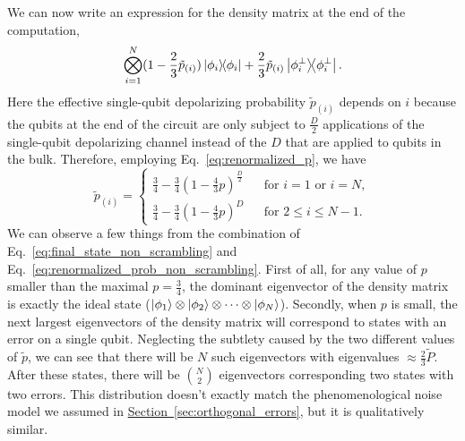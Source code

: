 \documentclass[
amsmath,
amssymb,
aps,
pra,
reprint,
twocolumn,
superscriptaddress,
longbibliography,
showkeys,
floatfix
]{revtex4-1}
\def\ket#1{\ensuremath{\mathinner{|{#1}\rangle}}}
\newcommand{\eq}[1]{Eq.~\hyperref[eq:#1]{\ref*{eq:#1}}}
\renewcommand{\sec}[1]{\hyperref[sec:#1]{Section~\ref*{sec:#1}}}
\begin{document}
We can now write an expression for the density matrix at the end of the
computation,
\begin{equation}
  \bigotimes_{i=1}^{N} (1 - \frac{2}{3}\tilde{p}_{(i)}) \ketbra{\phi_i} + \frac{2}{3}\tilde{p}_{(i)} \ketbra{\phi_i^\perp}.
  \label{eq:final_state_non_scrambling}
\end{equation}
Here the effective single-qubit depolarizing probability \(\tilde{p}_{(i)}\)
depends on \(i\) because the qubits at the end of the circuit are only subject
to \(\frac{D}{2}\) applications of the single-qubit depolarizing channel instead
of the \(D\) that are applied to qubits in the bulk. 
Therefore, employing \eq{renormalized_p}, we have
\begin{equation}
  \tilde{p}_{(i)}= \left\{ 
    \begin{array}{cll}
      \frac{3}{4} - \frac{3}{4}(1- \frac{4}{3} p)^\frac{D}{2} && \text{for } i = 1 \text{ or } i = N, \\[8pt]
      \frac{3}{4} - \frac{3}{4}(1- \frac{4}{3} p)^D && \text{for } 2 \leq i \leq N - 1.
    \end{array} \right.
  \label{eq:renormalized_prob_non_scrambling}
\end{equation}
We can observe a few things from the combination of
\eq{final_state_non_scrambling} and \eq{renormalized_prob_non_scrambling}. 
First of all, for any value of \(p\) smaller than the maximal \(p =
\frac{3}{4}\), the dominant eigenvector of the density matrix is exactly the
ideal state (\(\ket{\phi_1} \otimes \ket{\phi_2} \otimes \cdots \otimes
\ket{\phi_N}\)). 
Secondly, when \(p\) is small, the next largest eigenvectors of the density
matrix will correspond to states with an error on a single qubit. 
Neglecting the subtlety caused by the two different values of \(\tilde{p}\), we
can see that there will be \(N\) such eigenvectors with eigenvalues \(\approx
\frac{2}{3} \tilde{P}\). 
After these states, there will be \(\binom{N}{2}\) eigenvectors corresponding
two states with two errors. 
This distribution doesn't exactly match the phenomenological noise model we
assumed in \sec{orthogonal_errors}, but it is qualitatively similar.
\end{document}
